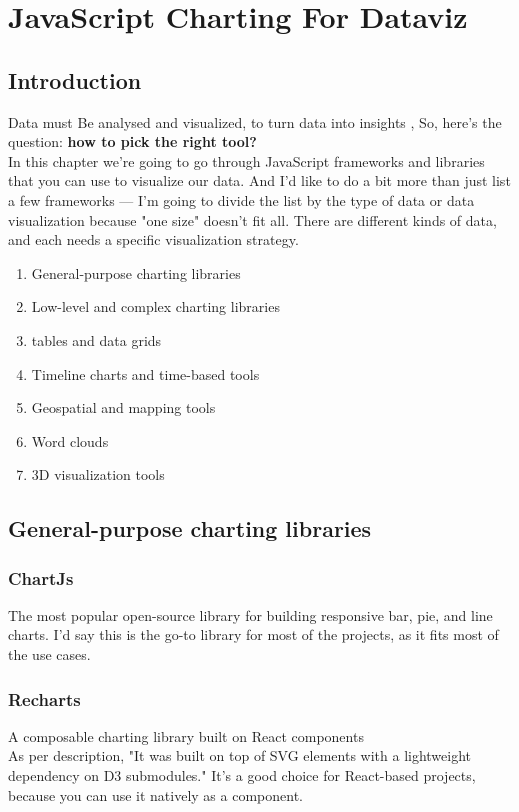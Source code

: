 
\chapter{JavaScript Charting For Dataviz}
\section{Introduction}
Data must Be analysed and visualized, to turn data into insights , So, here's the question: \textbf{how to pick the right tool?}\\

In this chapter we're going to go through JavaScript frameworks and libraries that you can use to visualize our data. And I'd like to do a bit more than just list a few frameworks — I'm going to divide the list by the type of data or data visualization because "one size" doesn't fit all. There are different kinds of data, and each needs a specific visualization strategy.
\begin{enumerate}
    \item General-purpose charting libraries
    \item Low-level and complex charting libraries
    \item tables and data grids
    \item Timeline charts and time-based tools
    \item Geospatial and mapping tools
    \item Word clouds
    \item 3D visualization tools
\end{enumerate}
 
\section{General-purpose charting libraries}
\subsection{ChartJs}
The most popular open-source library \cite{rajvsp2019approach}for building responsive bar, pie, and line charts. I'd say this is the go-to library for most of the projects, as it fits most of the use cases.
\subsection{Recharts}
A composable charting library built on React components \\

As per description, "It was built on top of SVG elements with a lightweight dependency on D3 submodules." It's a good choice for React-based projects, because you can use it natively as a component.
